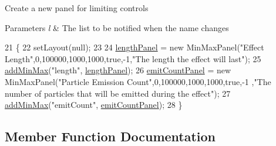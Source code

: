 Create a new panel for limiting controls


\begin{DoxyParams}{Parameters}
{\em l} & The list to be notified when the name changes \\
\hline
\end{DoxyParams}

\begin{DoxyCode}
21                                      \{
22         setLayout(null);
23         
24         \mbox{\hyperlink{classorg_1_1newdawn_1_1slick_1_1tools_1_1peditor_1_1_limit_panel_ad3bc8a56a885b464af5b4e62fa362ca1}{lengthPanel}} = \textcolor{keyword}{new} MinMaxPanel(\textcolor{stringliteral}{"Effect Length"},0,100000,1000,1000,\textcolor{keyword}{true},-1,\textcolor{stringliteral}{"The length the
       effect will last"});
25         \mbox{\hyperlink{classorg_1_1newdawn_1_1slick_1_1tools_1_1peditor_1_1_control_panel_aae097ab8bc9bd722af51818b15bcc823}{addMinMax}}(\textcolor{stringliteral}{"length"}, \mbox{\hyperlink{classorg_1_1newdawn_1_1slick_1_1tools_1_1peditor_1_1_limit_panel_ad3bc8a56a885b464af5b4e62fa362ca1}{lengthPanel}});
26         \mbox{\hyperlink{classorg_1_1newdawn_1_1slick_1_1tools_1_1peditor_1_1_limit_panel_a045b6429f6d14167c06956c97ca71e49}{emitCountPanel}} = \textcolor{keyword}{new} MinMaxPanel(\textcolor{stringliteral}{"Particle Emission Count"},0,100000,1000,1000,\textcolor{keyword}{true},-1
      ,\textcolor{stringliteral}{"The number of particles that will be emitted during the effect"});
27         \mbox{\hyperlink{classorg_1_1newdawn_1_1slick_1_1tools_1_1peditor_1_1_control_panel_aae097ab8bc9bd722af51818b15bcc823}{addMinMax}}(\textcolor{stringliteral}{"emitCount"}, \mbox{\hyperlink{classorg_1_1newdawn_1_1slick_1_1tools_1_1peditor_1_1_limit_panel_a045b6429f6d14167c06956c97ca71e49}{emitCountPanel}});
28     \}
\end{DoxyCode}


\subsection{Member Function Documentation}
\mbox{\label{classorg_1_1newdawn_1_1slick_1_1tools_1_1peditor_1_1_limit_panel_a193a0ea6307de7fe4d2b9f04920e52e5}} 
